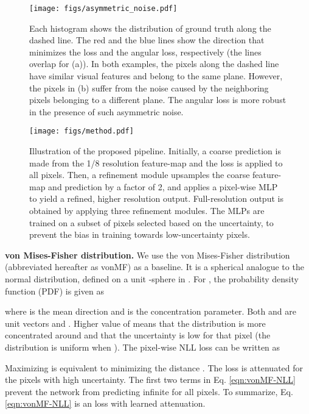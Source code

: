 \documentclass[10pt,twocolumn,letterpaper]{article}
\begin{document}
\begin{figure}[t]
\begin{center}
\texttt{[image: figs/asymmetric\_noise.pdf]}
\end{center}
\caption{Each histogram shows the distribution of ground truth along the dashed line. The red and the blue lines show the direction that minimizes the  loss and the angular loss, respectively (the lines overlap for (a)). In both examples, the pixels along the dashed line have similar visual features and belong to the same plane. However, the pixels in (b) suffer from the noise caused by the neighboring pixels belonging to a different plane. The angular loss is more robust in the presence of such asymmetric noise.}
\label{fig:robustness_of_AL}
\end{figure}

\begin{figure*}[t]
\begin{center}
\texttt{[image: figs/method.pdf]}
\end{center}
\caption{Illustration of the proposed pipeline. Initially, a coarse prediction is made from the 1/8 resolution feature-map and the loss is applied to all pixels. Then, a refinement module upsamples the coarse feature-map and prediction by a factor of 2, and applies a pixel-wise MLP to yield a refined, higher resolution output. Full-resolution output is obtained by applying three refinement modules. The MLPs are trained on a subset of pixels selected based on the uncertainty, to prevent the bias in training towards low-uncertainty pixels.}
\label{fig:method}
\end{figure*}

\noindent
\textbf{von Mises-Fisher distribution.} We use the von Mises-Fisher distribution \cite{fisher1993statistical} (abbreviated hereafter as vonMF) as a baseline. It is a spherical analogue to the normal distribution, defined on a unit -sphere in  \cite{moments_of_vMF}. For , the probability density function (PDF) is given as

\noindent
where  is the mean direction and  is the concentration parameter. Both  and  are unit vectors and . Higher value of  means that the distribution is more concentrated around  and that the uncertainty is low for that pixel (the distribution is uniform when ). The pixel-wise NLL loss can be written as


Maximizing  is equivalent to minimizing the  distance . The loss is attenuated for the pixels with high uncertainty. The first two terms in Eq. \ref{eqn:vonMF-NLL} prevent the network from predicting infinite  for all pixels. To summarize, Eq. \ref{eqn:vonMF-NLL} is an  loss with learned attenuation.
\end{document}
